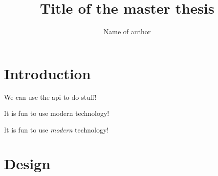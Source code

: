 \documentclass[final,10pt]{../../uit-thesis}
\begin{document}

\title{Title of the master thesis}
\author{Name of author}


\maketitle

\frontmatter

\tableofcontents


\printglossaries
{}

\mainmatter

\chapter{Introduction}
\lipsum[1]
\lipsum[1]
\lipsum[1-7]

We can use the \ac{api} to do stuff!

It is fun to use modern  technology!

It is fun to use \emph{modern } technology!

\chapter{Design}
\lipsum[8-10]

\backmatter
\end{document}

